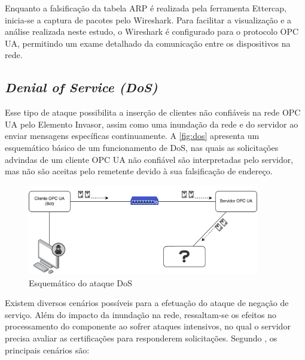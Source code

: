     Enquanto a falsificação da tabela ARP é realizada pela ferramenta Ettercap, inicia-se a captura de pacotes pelo Wireshark. Para facilitar a visualização e a análise realizada neste estudo, o Wireshark é configurado para o protocolo OPC UA, permitindo um exame detalhado da comunicação entre os dispositivos na rede.
    
    \subsection{\textit{Denial of Service (DoS)}}

    Esse tipo de ataque possibilita a inserção de clientes não confiáveis na rede OPC UA pelo Elemento Invasor, assim como uma inundação da rede e do servidor ao enviar mensagens específicas continuamente. A \autoref{fig:dos} apresenta um esquemático básico de um funcionamento de DoS, nas quais as solicitações advindas de um cliente OPC UA não confiável são interpretadas pelo servidor, mas não são aceitas pelo remetente devido à sua falsificação de endereço.

     \begin{figure}[htbp]
        \caption{\label{fig:dos}Esquemático do ataque DoS}
        \begin{center}
            \includegraphics[width=0.9\textwidth]{USPSC-img/dos.png}
        \end{center}
    \end{figure}
    
    Existem diversos cenários possíveis para a efetuação do ataque de negação de serviço. Além do impacto da inundação na rede, ressaltam-se os efeitos no processamento do componente ao sofrer ataques intensivos, no qual o servidor precisa avaliar as certificações para responderem solicitações. Segundo , os principais cenários são:

